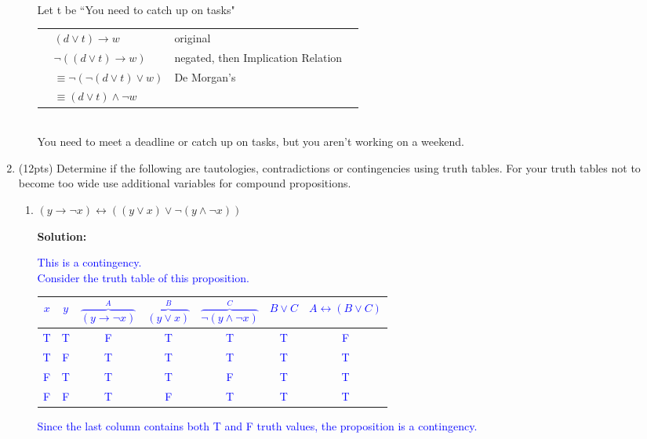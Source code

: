 \documentclass{article}
\renewcommand{\implies}{\rightarrow}
\newcommand{\same}{\leftrightarrow}
\newcommand{\sol}[1]{\textbf{Solution:\,}\textcolor{blue}{#1}}
\begin{document}
\begin{enumerate}
\begin{enumerate}
{\\Let t be ``You need to catch up on tasks"
\\\begin{tabular}{llll}
&\quad$(d \lor t)\implies w$ & original\\
&\quad$\neg((d \lor t)\implies w)$&negated, then Implication Relation\\
&$\equiv\neg(\neg(d \lor t)\lor w)$&De Morgan's\\
&$\equiv(d \lor t)\land \neg w$\\
\end{tabular}
\\You need to meet a deadline or catch up on tasks, but you aren't working on a weekend.
}
\end{enumerate}

\newpage

\item(12pts) Determine if the following are tautologies, contradictions or contingencies using truth tables. For your truth tables not to become too wide use additional variables for compound propositions.
\begin{enumerate}
\item $(y \implies \neg x) \same ((y \lor x) \lor \neg(y \land \neg x))$

\sol{This is a contingency. \\
Consider the truth table of this proposition.
\begin{center}
\begin{tabular}{cc|ccccc}
$x$ & $y$ & $\overbrace{(y \implies \neg x)}^A$ & $\overbrace{(y \lor x)}^B$ & $\overbrace{\neg(y \land \neg x)}^C$ & $B \lor C$ & $A \same (B \lor C)$ \\\hline
T & T & F & T & T & T & F \\
T & F & T & T & T & T & T \\
F & T & T & T & F & T & T \\
F & F & T & F & T & T & T
\end{tabular}
\end{center}
Since the last column contains both T and F truth values, the proposition is a contingency.}


\end{enumerate}
\end{enumerate}
\end{document}
